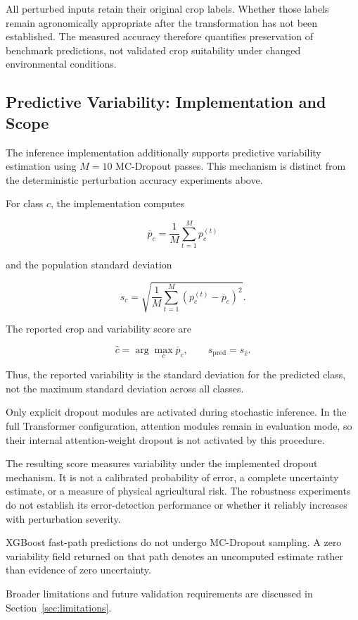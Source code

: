 All perturbed inputs retain their original crop labels.
Whether those labels remain agronomically appropriate after
the transformation has not been established. The measured
accuracy therefore quantifies preservation of benchmark
predictions, not validated crop suitability under changed
environmental conditions.

\subsection{Predictive Variability: Implementation and Scope}

The inference implementation additionally supports predictive
variability estimation using $M=10$ MC-Dropout passes.
This mechanism is distinct from the deterministic perturbation
accuracy experiments above.

For class $c$, the implementation computes

\begin{equation}
\overline{p}_c
=
\frac{1}{M}
\sum_{t=1}^{M}p_c^{(t)}
\label{eq:robustness_mc_mean}
\end{equation}

and the population standard deviation

\begin{equation}
s_c
=
\sqrt{
\frac{1}{M}
\sum_{t=1}^{M}
\left(p_c^{(t)}-\overline{p}_c\right)^2
}.
\label{eq:robustness_mc_std}
\end{equation}

The reported crop and variability score are

\begin{equation}
\hat{c}
=
\arg\max_c \overline{p}_c,
\qquad
s_{\mathrm{pred}}=s_{\hat{c}}.
\label{eq:robustness_variability}
\end{equation}

Thus, the reported variability is the standard deviation for
the predicted class, not the maximum standard deviation
across all classes.

Only explicit dropout modules are activated during stochastic
inference. In the full Transformer configuration, attention
modules remain in evaluation mode, so their internal
attention-weight dropout is not activated by this procedure.

The resulting score measures variability under the implemented
dropout mechanism. It is not a calibrated probability of error,
a complete uncertainty estimate, or a measure of physical
agricultural risk. The robustness experiments do not establish
its error-detection performance or whether it reliably increases
with perturbation severity.

XGBoost fast-path predictions do not undergo MC-Dropout sampling.
A zero variability field returned on that path denotes an
uncomputed estimate rather than evidence of zero uncertainty.


Broader limitations and future validation requirements are discussed
in Section~\ref{sec:limitations}.

